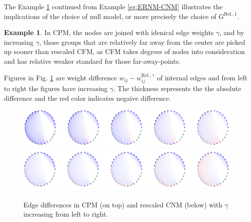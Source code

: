 \documentclass[11pt]{article}
\theoremstyle{definition}
\theoremstyle{definition}
\newtheorem{eg}{Example}
\theoremstyle{definition}
\theoremstyle{remark}
\theoremstyle{plain}
\begin{document}
The Example \ref{eg:rescaled-ERNM-CNM} continued from Example \ref{eg:ERNM-CNM} illustrates the implications of the choice of null model, or more precisely the choice of $G^{\text{Ref.}, 1}$.

\begin{eg}\label{eg:rescaled-ERNM-CNM}
	In CPM, the nodes are joined with idenical edge weights $\gamma$, and by increasing $\gamma$, those groups that are relatively far away from the center are picked up sooner than rescaled CFM, as CFM takes degrees of nodes into consideration and has relative weaker standard for those far-away-points.

	Figures in Fig. \ref{fig:edge-differences} are weight difference $w_{ij} - w^{\text{Ref.},\gamma}_{ij}$ of internal edges and from left to right the figures have increasing $\gamma$. The thickness represents the the absolute difference and the red color indicates negaive difference.

	\begin{figure}[!h]
		\centering
		\includegraphics*[width=.8\textwidth]{CPM_diff.PNG}
		\includegraphics*[width=.8\textwidth]{CNM_diff.PNG}
		\caption{Edge differences in CPM (on top) and rescaled CNM (below) with $\gamma$ increasing from left to right.}
		\label{fig:edge-differences}
	\end{figure}
\end{eg}

\end{document}
